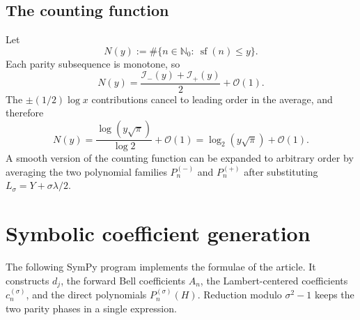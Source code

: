 \documentclass[11pt,a4paper]{article}
\numberwithin{equation}{section}
\theoremstyle{definition}
\theoremstyle{remark}
\newcommand{\Ord}{\mathcal O}
\newcommand{\SF}{\operatorname{sf}}
\begin{document}
\subsection{The counting function}

Let
\begin{equation}\label{eq:counting-def}
 N(y):=\#\{n\in\mathbb N_0:\ \SF(n)\le y\}.
\end{equation}
Each parity subsequence is monotone, so
\begin{equation}\label{eq:counting-inverses}
 N(y)=\frac{\mathcal I_-(y)+\mathcal I_+(y)}2+\Ord(1).
\end{equation}
The \(\pm(1/2)\log x\) contributions cancel to leading order in the average,
and therefore
\begin{equation}\label{eq:counting-leading}
 \boxed{\qquad
 N(y)=\frac{\log(y\sqrt\pi)}{\log2}+\Ord(1)
 =\log_2(y\sqrt\pi)+\Ord(1).
 \qquad}
\end{equation}
A smooth version of the counting function can be expanded to arbitrary order
by averaging the two polynomial families
\(P_n^{(-)}\) and \(P_n^{(+)}\) after substituting
\(L_\sigma=Y+\sigma\lambda/2\).

\section{Symbolic coefficient generation}
\label{sec:symbolic}

The following SymPy program implements the formulae of the article.  It
constructs \(d_j\), the forward Bell coefficients \(A_n\), the
Lambert-centered coefficients \(c_n^{(\sigma)}\), and the direct
polynomials \(P_n^{(\sigma)}(H)\).  Reduction modulo \(\sigma^2-1\) keeps
the two parity phases in a single expression.
\end{document}
